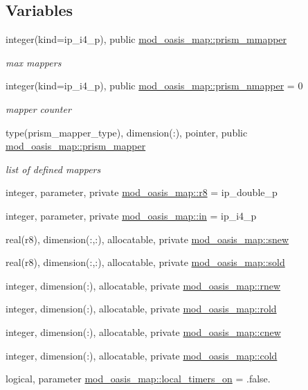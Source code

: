 \subsection*{Variables}
\begin{DoxyCompactItemize}
\item 
integer(kind=ip\+\_\+i4\+\_\+p), public \hyperlink{namespacemod__oasis__map_ab15f72e9f33a67181edc977c06b951e2}{mod\+\_\+oasis\+\_\+map\+::prism\+\_\+mmapper}
\begin{DoxyCompactList}\small\item\em max mappers \end{DoxyCompactList}\item 
integer(kind=ip\+\_\+i4\+\_\+p), public \hyperlink{namespacemod__oasis__map_af543b83ec5bed63a4448ff641137b0c5}{mod\+\_\+oasis\+\_\+map\+::prism\+\_\+nmapper} = 0
\begin{DoxyCompactList}\small\item\em mapper counter \end{DoxyCompactList}\item 
type(prism\+\_\+mapper\+\_\+type), dimension(\+:), pointer, public \hyperlink{namespacemod__oasis__map_a00ad53f61b6998938fca792455487f7e}{mod\+\_\+oasis\+\_\+map\+::prism\+\_\+mapper}
\begin{DoxyCompactList}\small\item\em list of defined mappers \end{DoxyCompactList}\item 
integer, parameter, private \hyperlink{namespacemod__oasis__map_a30ebe320b9e4c06a1ee1f2a0bbacf2c4}{mod\+\_\+oasis\+\_\+map\+::r8} = ip\+\_\+double\+\_\+p
\item 
integer, parameter, private \hyperlink{namespacemod__oasis__map_aa58997467050224f6db2bc93fe5f7ca1}{mod\+\_\+oasis\+\_\+map\+::in} = ip\+\_\+i4\+\_\+p
\item 
real(r8), dimension(\+:,\+:), allocatable, private \hyperlink{namespacemod__oasis__map_a28b59479c467c58995c6300071ca140a}{mod\+\_\+oasis\+\_\+map\+::snew}
\item 
real(r8), dimension(\+:,\+:), allocatable, private \hyperlink{namespacemod__oasis__map_a1fc7e7f295910352524d442c5d0dbf79}{mod\+\_\+oasis\+\_\+map\+::sold}
\item 
integer, dimension(\+:), allocatable, private \hyperlink{namespacemod__oasis__map_a2575785d3ea5e1a37c7f6303f00eb727}{mod\+\_\+oasis\+\_\+map\+::rnew}
\item 
integer, dimension(\+:), allocatable, private \hyperlink{namespacemod__oasis__map_a2931a6f582d0173cc0e6b155b8cb55b7}{mod\+\_\+oasis\+\_\+map\+::rold}
\item 
integer, dimension(\+:), allocatable, private \hyperlink{namespacemod__oasis__map_a8ae737bd62499fe60ebb48d04ad3b6dd}{mod\+\_\+oasis\+\_\+map\+::cnew}
\item 
integer, dimension(\+:), allocatable, private \hyperlink{namespacemod__oasis__map_a479ecc5b0be5d1adf3973cb08c40d30a}{mod\+\_\+oasis\+\_\+map\+::cold}
\item 
logical, parameter \hyperlink{namespacemod__oasis__map_a0d8a50381f5e15cf11c1c845348c5062}{mod\+\_\+oasis\+\_\+map\+::local\+\_\+timers\+\_\+on} = .false.
\end{DoxyCompactItemize}

